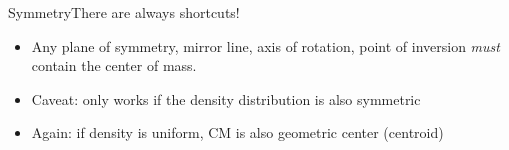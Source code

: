 \documentclass[12pt,compress,aspectratio=169]{beamer}
\begin{document}
%
%      



\begin{frame}{Symmetry}{There are always shortcuts!}
  \begin{itemize}
  \item Any plane of symmetry, mirror line, axis of rotation, point of inversion
    \emph{must} contain the center of mass.
  \item Caveat: only works if the density distribution is also symmetric
  \item Again: if density is uniform, CM is also geometric center (centroid)
  \end{itemize}
\end{frame}
\end{document}
